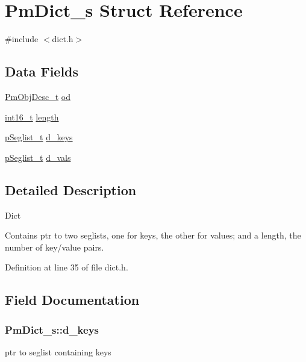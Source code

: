 \hypertarget{struct_pm_dict__s}{\section{Pm\-Dict\-\_\-s Struct Reference}
\label{struct_pm_dict__s}
}


{\ttfamily \#include $<$dict.\-h$>$}

\subsection*{Data Fields}
\begin{DoxyCompactItemize}
\item 
\hyperlink{obj_8h_a72d816790acd8eb550fb25268c2b3489}{Pm\-Obj\-Desc\-\_\-t} \hyperlink{struct_pm_dict__s_a601bf9411e40c8878b2fb4345af7e9b7}{od}
\item 
\hyperlink{stdint_8h_aa343fa3b3d06292b959ffdd4c4703b06}{int16\-\_\-t} \hyperlink{struct_pm_dict__s_ab892163e496cd52f2a5a40ca46341cc3}{length}
\item 
\hyperlink{seglist_8h_a3b2ef6a71a86b781a480a7f46cb9ab7d}{p\-Seglist\-\_\-t} \hyperlink{struct_pm_dict__s_ad965006607e1cd25d8785cbadf50fd40}{d\-\_\-keys}
\item 
\hyperlink{seglist_8h_a3b2ef6a71a86b781a480a7f46cb9ab7d}{p\-Seglist\-\_\-t} \hyperlink{struct_pm_dict__s_a90dac7a83c7cdffe63ef92317093a955}{d\-\_\-vals}
\end{DoxyCompactItemize}


\subsection{Detailed Description}
Dict

Contains ptr to two seglists, one for keys, the other for values; and a length, the number of key/value pairs. 

Definition at line 35 of file dict.\-h.



\subsection{Field Documentation}
\hypertarget{struct_pm_dict__s_ad965006607e1cd25d8785cbadf50fd40}{
\subsubsection[{d\-\_\-keys}]{ Pm\-Dict\-\_\-s\-::d\-\_\-keys}}\label{struct_pm_dict__s_ad965006607e1cd25d8785cbadf50fd40}
ptr to seglist containing keys 

